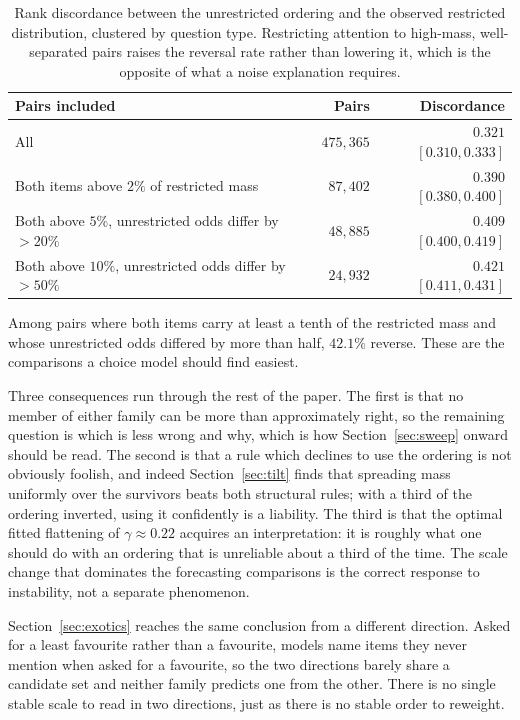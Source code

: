 \documentclass[11pt]{article}
\begin{document}
\begin{table}[ht]
\centering
\small
\begin{tabular}{lrr}
\toprule
Pairs included & Pairs & Discordance \\
\midrule
All & $475{,}365$ & $0.321$ $[0.310, 0.333]$ \\
Both items above $2\%$ of restricted mass & $87{,}402$ & $0.390$ $[0.380, 0.400]$ \\
Both above $5\%$, unrestricted odds differ by $>20\%$ & $48{,}885$ & $0.409$ $[0.400, 0.419]$ \\
Both above $10\%$, unrestricted odds differ by $>50\%$ & $24{,}932$ & $\mathbf{0.421}$ $[0.411, 0.431]$ \\
\bottomrule
\end{tabular}
\caption{Rank discordance between the unrestricted ordering and the observed
restricted distribution, clustered by question type. Restricting attention to
high-mass, well-separated pairs raises the reversal rate rather than lowering it,
which is the opposite of what a noise explanation requires.}
\label{tab:discord}
\end{table}

Among pairs where both items carry at least a tenth of the restricted mass and
whose unrestricted odds differed by more than half, $42.1\%$ reverse. These are
the comparisons a choice model should find easiest.

Three consequences run through the rest of the paper. The first is that no
member of either family can be more than approximately right, so the remaining
question is which is less wrong and why, which is how Section~\ref{sec:sweep}
onward should be read. The second is that a rule which declines to use the
ordering is not obviously foolish, and indeed Section~\ref{sec:tilt} finds that
spreading mass uniformly over the survivors beats both structural rules; with a
third of the ordering inverted, using it confidently is a liability. The third is
that the optimal fitted flattening of $\gamma \approx 0.22$ acquires an
interpretation: it is roughly what one should do with an ordering that is
unreliable about a third of the time. The scale change that dominates the
forecasting comparisons is the correct response to instability, not a separate
phenomenon.

Section~\ref{sec:exotics} reaches the same conclusion from a different
direction. Asked for a least favourite rather than a favourite, models name items
they never mention when asked for a favourite, so the two directions barely share
a candidate set and neither family predicts one from the other. There is no
single stable scale to read in two directions, just as there is no stable order
to reweight.
\end{document}
